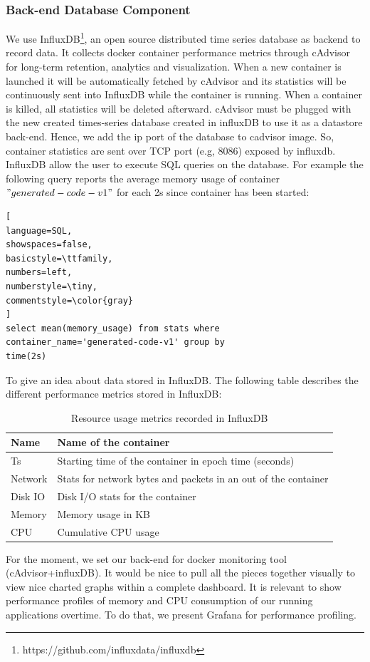 \subsubsection{Back-end Database Component}
We use InfluxDB\footnote{https://github.com/influxdata/influxdb}, an open source distributed time series database as backend to record data. It collects docker container performance metrics through cAdvisor for long-term retention, analytics and visualization. When a new container is launched it will be automatically fetched by cAdvisor and its statistics will be continuously sent into InfluxDB while the container is running. When a container is killed, all statistics will be deleted afterward. cAdvisor must be plugged with the new created
times-series database created in influxDB to use it as a datastore back-end. Hence, we add the ip port of the database to cadvisor image. So, container statistics are sent over TCP port (e.g, 8086) exposed by influxdb.
InfluxDB allow the user to execute SQL queries on the database. For example the following query reports the average memory usage of container $"generated-code-v1"$ for each 2s since container has been started:

\begin{lstlisting}[
language=SQL,
showspaces=false,
basicstyle=\ttfamily,
numbers=left,
numberstyle=\tiny,
commentstyle=\color{gray}
]
select mean(memory_usage) from stats where 
container_name='generated-code-v1' group by 
time(2s)
\end{lstlisting}
To give an idea about data stored in InfluxDB. The following table describes the different performance metrics stored in InfluxDB:
 \begin{table}[h]
 	\begin{center}
 		\begin{tabular}{|p{1cm}|p{6.9cm}|}
 			\hline
 			 Name & Name of the container \\
 			\hline
 			 Ts & Starting time of the container in epoch time (seconds) \\
 			\hline
 			 Network &  Stats for network bytes and packets in an out of the container \\
 			\hline
 			 Disk IO &  Disk I/O stats for the container \\
 			\hline
 			 Memory &  Memory usage in KB \\
 			
 			\hline
 		   	CPU &  Cumulative CPU usage \\
 			\hline
 			
 		\end{tabular}
 		
 	\end{center}
 	\caption {Resource usage metrics recorded in InfluxDB}
 \end{table}
For the moment, we set our back-end for docker monitoring tool (cAdvisor+influxDB). It would be nice to pull all the pieces together visually to view nice charted graphs within a complete dashboard. It is relevant to show performance profiles of memory and CPU consumption of our running applications overtime. To do that, we present Grafana for performance profiling. 

